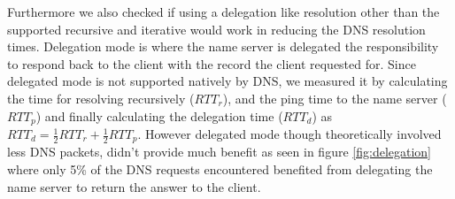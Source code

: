 \documentclass[conference]{IEEEtran}
\begin{document}
Furthermore we also checked if using a delegation like resolution other than the supported recursive and iterative would work in reducing the DNS resolution times. Delegation mode is where the name server is delegated the responsibility to respond back to the client with the record the client requested for. Since delegated mode is not supported natively by DNS, we measured it by calculating the time for resolving recursively ($RTT_r$), and the ping time to the name server ($RTT_p$) and finally calculating the delegation time ($RTT_d$) as $RTT_d = \frac{1}{2}RTT_r + \frac{1}{2}RTT_p$. However delegated mode though theoretically involved less DNS packets, didn't provide much benefit as seen in figure \ref{fig:delegation} where only 5\% of the DNS requests encountered benefited from delegating the name server to return the answer to the client.
\end{document}
